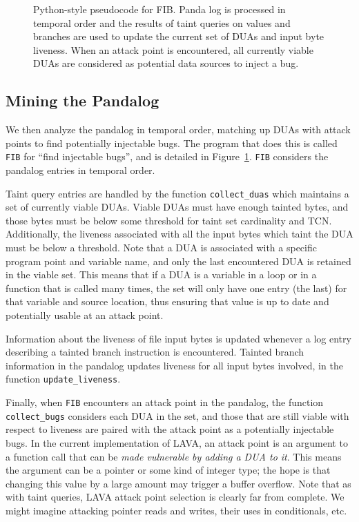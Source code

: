\begin{figure}

\caption{Python-style pseudocode for FIB. 
Panda log is processed in temporal order and the results of taint queries on values and branches are 
used to update the current set of DUAs and input byte liveness.
When an attack point is encountered, all currently viable DUAs are considered as potential data sources to inject a bug.}
\label{alg:fib}
\end{figure}

\subsection{Mining the Pandalog}
\label{sec:mining}

We then analyze the pandalog in temporal order, matching up DUAs with attack points to find potentially injectable bugs.
The program that does this is called \verb+FIB+ for ``find injectable bugs'', and is detailed in Figure~\ref{alg:fib}.
\verb+FIB+ considers the pandalog entries in temporal order.

Taint query entries are handled by the function \verb+collect_duas+ which maintains a set of currently viable DUAs.
Viable DUAs must have enough tainted bytes, and those bytes must be below some threshold for taint set cardinality and TCN.
Additionally, the liveness associated with all the input bytes which taint the DUA must be below a threshold.
Note that a DUA is associated with a specific program point and variable name, and only the last encountered DUA is retained in the viable set. 
This means that if a DUA is a variable in a loop or in a function that is called many times, the set will only have one entry (the last) for that variable and source location, thus ensuring that value is up to date and potentially usable at an attack point.  

Information about the liveness of file input bytes is updated whenever a log entry describing a tainted branch instruction is encountered.
Tainted branch information in the pandalog updates liveness for all input bytes involved, in the function \verb+update_liveness+.

Finally, when \verb+FIB+ encounters an attack point in the pandalog, the function \verb+collect_bugs+ considers each DUA in the set,
and those that are still viable with respect to liveness are paired with the attack point as a potentially injectable bugs.
In the current implementation of LAVA, an attack point is an argument to a function call that can be \emph{made vulnerable by adding a DUA to it}.
This means the argument can be a pointer or some kind of integer type; the hope is that changing this value by a large amount may trigger a buffer overflow.
Note that as with taint queries, LAVA attack point selection is clearly far from complete.
We might imagine attacking pointer reads and writes, their uses in conditionals, etc.  

